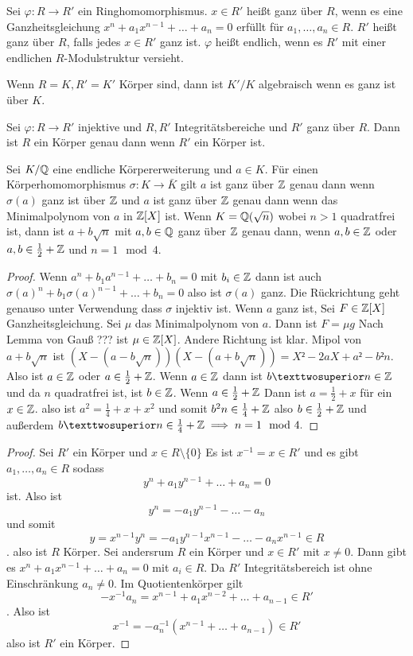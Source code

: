 \begin{Def}
    Sei $\varphi\colon R\to R'$ ein Ringhomomorphismus. $x\in R'$ heißt ganz über $R$, wenn es eine Ganzheitsgleichung $x^n+a_1x^{n-1}+\dots+a_n=0$ erfüllt für $a_1,\dots,a_n\in R$.
    $R'$ heißt ganz über $R$, falls jedes $x\in R'$ ganz ist. $\varphi$ heißt endlich, wenn es $R'$ mit einer endlichen $R$-Modulstruktur versieht.
\end{Def}
\begin{Bsp}
    Wenn $R=K, R'=K'$ Körper sind, dann ist $K'/K$ algebraisch wenn es ganz ist über $K$.
\end{Bsp}
\begin{Lemma}\label{Lem:GanzheitKörper}
    Sei $\varphi\colon R\to R'$ injektive und $R,R'$ Integritätsbereiche und $R'$ ganz über $R$. Dann ist $R$ ein Körper genau dann wenn $R'$ ein Körper ist. 
\end{Lemma}
\begin{Bps}
     Sei $K/\mathbb{Q}$ eine endliche Körpererweiterung und $a\in K$. Für einen Körperhomomorphismus $\sigma\colon K\to\bar K$ gilt $a$ ist ganz über $\mathbb{Z}$ genau dann wenn $\sigma(a)$ ganz ist über $\mathbb{Z}$ und $a$ ist ganz über $\mathbb{Z}$ genau dann wenn das Minimalpolynom von $a$ in $\mathbb{Z}[X]$ ist. Wenn $K=\mathbb{Q}(\sqrt{n})$ wobei $n>1$ quadratfrei ist, dann ist $a+b\sqrt{n}$ mit $a,b\in \mathbb{Q}$ ganz über $\mathbb{Z}$ genau dann, wenn $a,b\in\mathbb{Z}$ oder $a,b\in\frac 1 2+\mathbb{Z}$ und $n=1\mod 4$.
\end{Bps}
\begin{proof}
    Wenn $a^n+b_1a^{n-1}+\dots+b_n=0$ mit $b_i\in\mathbb{Z}$ dann ist auch $\sigma(a)^n+b_1\sigma(a)^{n-1}+\dots+b_n=0$ also ist $\sigma(a)$ ganz. Die Rückrichtung geht genauso unter Verwendung dass $\sigma$ injektiv ist.
    Wenn $a$ ganz ist, Sei $F\in \mathbb{Z}[X]$ Ganzheitsgleichung. Sei $\mu$ das Minimalpolynom von $a$. Dann ist $F=\mu g$
    Nach Lemma von Gauß ??? ist $\mu\in\mathbb{Z}[X]$.
    Andere Richtung ist klar.
    Mipol von $a+b\sqrt{n}$ ist $(X-(a-b\sqrt{n}))(X-(a+b\sqrt n))=X²-2aX+a²-b²n$.
    Also ist $a\in \mathbb{Z}$ oder $a\in  \frac 1 2+\mathbb{Z}$.
    Wenn $a\in\mathbb{Z}$ dann ist $b²n\in\ZZ$ und da $n$ quadratfrei ist, ist $b\in\mathbb{Z}$. 
    Wenn $a\in \frac 1 2+\mathbb{Z}$ Dann ist $a=\frac 1 2+x$ für ein $x\in\mathbb{Z}$.
    also ist $a^2=\frac 1 4+x+x^2$ und somit $b^2n\in \frac 1 4+\mathbb{Z}$ also $b\in \frac 1 2+\mathbb{Z}$ und außerdem $b²n\in \frac 1 4+\ZZ\implies n=1\mod 4.$
\end{proof}
\begin{proof}
    Sei $R'$ ein Körper und $x\in R\setminus\{0\}$ Es ist $x^{-1}=x\in R'$ und es gibt $a_1,\dots,a_n\in R$ sodass $$y^n+a_1y^{n-1}+\dots+a_n=0$$ ist. Also ist 
    $$y^n=-a_1y^{n-1}-\dots-a_n$$ und somit $$y=x^{n-1}y^n=-a_1y^{n-1}x^{n-1}-\dots -a_nx^{n-1}\in R$$.
    also ist $R$ Körper.
    Sei andersrum $R$ ein Körper und $x\in R'$ mit $x\neq 0$.
    Dann gibt es $x^n+a_1x^{n-1}+\dots+a_n=0$ mit $a_i\in R$.
    Da $R'$ Integritätsbereich ist ohne Einschränkung $a_n\neq 0$.
    Im Quotientenkörper gilt $$-x^{-1}a_n=x^{n-1}+a_1x^{n-2}+\dots+a_{n-1}\in R'$$. Also ist $$x^{-1}=-a_n^{-1}(x^{n-1}+\dots +a_{n-1})\in R'$$ also ist $R'$ ein Körper.
\end{proof}
